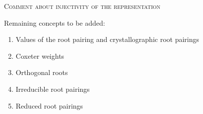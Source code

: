 \textsc{Comment about injectivity of the representation}






Remaining concepts to be added:
\begin{enumerate}
    \item Values of the root pairing and crystallographic root pairings
    \item Coxeter weights
    \item Orthogonal roots 
    \item Irreducible root pairings
    \item Reduced root pairings
\end{enumerate}